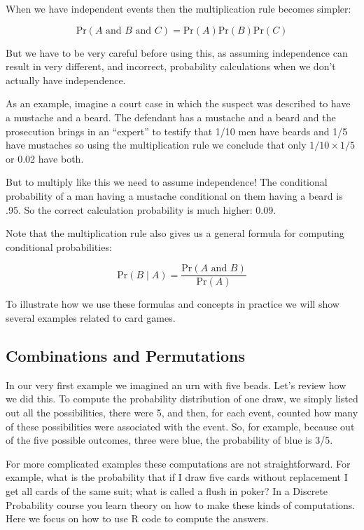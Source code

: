 \documentclass[
  openany]{book}
\begin{document}
When we have independent events then the multiplication rule becomes simpler:

\[
\mbox{Pr}(A \mbox{ and } B \mbox{ and } C) = \mbox{Pr}(A)\mbox{Pr}(B)\mbox{Pr}(C)
\]

But we have to be very careful before using this, as assuming independence can result in very different, and incorrect, probability calculations when we don't actually have independence.

As an example, imagine a court case in which the suspect was described to have a mustache and a beard. The defendant has a mustache and a beard and the prosecution brings in an ``expert'' to testify that 1/10 men have beards and 1/5 have mustaches so using the multiplication rule we conclude that only \(1/10 \times 1/5\) or 0.02 have both.

But to multiply like this we need to assume independence! The conditional probability of a man having a mustache conditional on them having a beard is .95. So the correct calculation probability is much higher: 0.09.

Note that the multiplication rule also gives us a general formula for computing conditional probabilities:

\[
\mbox{Pr}(B \mid A) = \frac{\mbox{Pr}(A \mbox{ and } B)}{ \mbox{Pr}(A)}
\]

To illustrate how we use these formulas and concepts in practice we will show several examples related to card games.

\hypertarget{combinations-and-permutations}{%
\subsection{Combinations and Permutations}\label{combinations-and-permutations}}

In our very first example we imagined an urn with five beads. Let's review how we did this. To compute the probability distribution of one draw, we simply listed out all the possibilities, there were 5, and then, for each event, counted how many of these possibilities were associated with the event. So, for example, because out of the five possible outcomes, three were blue, the probability of blue is 3/5.

For more complicated examples these computations are not straightforward. For example, what is the probability that if I draw five cards without replacement I get all cards of the same suit; what is called a flush in poker? In a Discrete Probability course you learn theory on how to make these kinds of computations. Here we focus on how to use R code to compute the answers.
\end{document}
